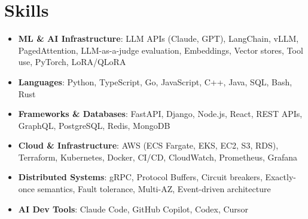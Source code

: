 \documentclass[letterpaper,11pt]{article}
\newcommand{\resumeSubHeadingListStart}{\begin{itemize}[leftmargin=0.15in, label={}]}
\newcommand{\resumeSubHeadingListEnd}{\end{itemize}}
\newcommand{\resumeSkillHeading}[2]{%
  \item\small{\textbf{#1}: #2 \vspace{-9pt}}%
}
\begin{document}
\section{Skills}
  \resumeSubHeadingListStart
    \resumeSkillHeading{ML \& AI Infrastructure}{LLM APIs (Claude, GPT), LangChain, vLLM, PagedAttention, LLM-as-a-judge evaluation, Embeddings, Vector stores, Tool use, PyTorch, LoRA/QLoRA}
    \resumeSkillHeading{Languages}{Python, TypeScript, Go, JavaScript, C++, Java, SQL, Bash, Rust}
    \resumeSkillHeading{Frameworks \& Databases}{FastAPI, Django, Node.js, React, REST APIs, GraphQL, PostgreSQL, Redis, MongoDB}
    \resumeSkillHeading{Cloud \& Infrastructure}{AWS (ECS Fargate, EKS, EC2, S3, RDS), Terraform, Kubernetes, Docker, CI/CD, CloudWatch, Prometheus, Grafana}
    \resumeSkillHeading{Distributed Systems}{gRPC, Protocol Buffers, Circuit breakers, Exactly-once semantics, Fault tolerance, Multi-AZ, Event-driven architecture}
    \resumeSkillHeading{AI Dev Tools}{Claude Code, GitHub Copilot, Codex, Cursor}
  \resumeSubHeadingListEnd
\end{document}
